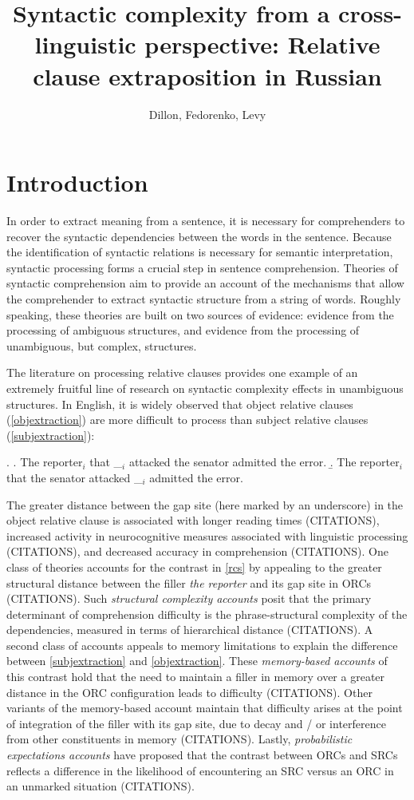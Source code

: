 \documentclass[12pt]{article}
\begin{document}
\title{Syntactic complexity from a cross-linguistic perspective: Relative clause extraposition in Russian}
\author{Dillon, Fedorenko, Levy}

\section{Introduction}
\label{sec:intro}

	In order to extract meaning from a sentence, it is necessary for comprehenders to recover the syntactic dependencies between the words in the sentence. Because the identification of syntactic relations is necessary for semantic interpretation, syntactic processing forms a crucial step in sentence comprehension. Theories of syntactic comprehension aim to provide an account of the mechanisms that allow the comprehender to extract syntactic structure from a string of words. Roughly speaking, these theories are built on two sources of evidence: evidence from the processing of ambiguous structures, and evidence from the processing of unambiguous, but complex, structures.
				
	The literature on processing relative clauses provides one example of an extremely fruitful line of research on syntactic complexity effects in unambiguous structures. In English, it is widely observed that object relative clauses (\ref{objextraction}) are more difficult to process than subject relative clauses (\ref{subjextraction}):
	
	\ex.	\label{rcs}
		\a.	\label{subjextraction} The reporter$_i$ that \_$_i$ attacked the senator admitted the error.
		\b.	\label{objextraction} The reporter$_i$ that the senator attacked \_$_i$ admitted the error. 
		
	The greater distance between the gap site (here marked by an underscore) in the object relative clause is associated with longer reading times (CITATIONS), increased activity in neurocognitive measures associated with linguistic processing (CITATIONS), and decreased accuracy in comprehension (CITATIONS). One class of theories accounts for the contrast in \ref{rcs} by appealing to the greater structural distance between the filler \textit{the reporter} and its gap site in ORCs (CITATIONS). Such \textit{structural complexity accounts} posit that the primary determinant of comprehension difficulty is the phrase-structural complexity of the dependencies, measured in terms of hierarchical distance (CITATIONS). A second class of accounts appeals to memory limitations to explain the difference between \ref{subjextraction} and \ref{objextraction}. These \textit{memory-based accounts} of this contrast hold that the need to maintain a filler in memory over a greater distance in the ORC configuration leads to difficulty (CITATIONS). Other variants of the memory-based account maintain that difficulty arises at the point of integration of the filler with its gap site, due to decay and / or interference from other constituents in memory (CITATIONS). Lastly, \textit{probabilistic expectations accounts} have proposed that the contrast between ORCs and SRCs reflects a difference in the likelihood of encountering an SRC versus an ORC in an unmarked situation (CITATIONS). 
	
\end{document}
